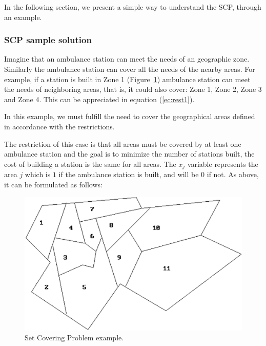 In the following section, we present a simple way to understand the SCP, through an example.\\

\subsubsection{SCP sample solution}
Imagine that an ambulance station can meet the needs of an geographic zone. Similarly the ambulance station can cover all the needs of the nearby areas. For example, if a station is built in Zone 1 (Figure~\ref{fig:SetCovering}) ambulance station can meet the needs of neighboring areas, that is, it could also cover: Zone 1, Zone 2, Zone 3 and Zone 4.  This can be appreciated in equation (\ref{ec:rest1}).

In this example, we must fulfill the need to cover the geographical areas defined in accordance with the restrictions.

The restriction of this case is that all areas must be covered by at least one ambulance station and the goal is to minimize the number of stations built, the cost of building a station is the same for all areas. The $x_j$ variable represents the area $j$ which is $1$ if the ambulance station is built, and will be $0$ if not. As above, it can be formulated as follows:

\squeezeup
\begin{figure}[!http]
	\begin{center}
		\includegraphics[scale=0.30]{Introduccion/imagenes/SetCovering.png} %
		\caption{Set Covering Problem example.}\label{fig:SetCovering}
	\end{center}
\end{figure}
\squeezeup


